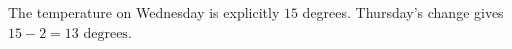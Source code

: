 The temperature on Wednesday is explicitly $ 15 $ degrees. Thursday's change gives $ 15-2=\boxed{13\text{ degrees}}$.
